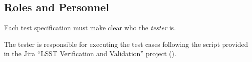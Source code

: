 






\subsection{Roles and Personnel}
\label{sect:roles}

Each test specification must make clear who the \emph{tester} is.

The tester is responsible for executing the test cases following the script provided in the Jira ``LSST Verification and Validation'' project ().


